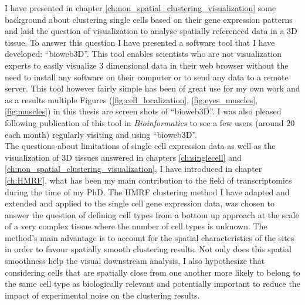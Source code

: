 I have presented in chapter \ref{ch:non_spatial_clustering_visualization} some background about clustering single cells based on their gene expression patterns and laid the question of visualization to analyse spatially referenced data in a 3D tissue. To answer this question I have presented a software tool that I have developed: ``bioweb3D''. This tool enables scientists who are not visualization experts to easily visualize 3 dimensional data in their web browser without the need to install any software on their computer or to send any data to a remote server. This tool however fairly simple has been of great use for my own work and as a results multiple Figures (\ref{fig:cell_localization}, \ref{fig:eyes_muscles}, \ref{fig:muscles}) in this thesis are screen shots of ``bioweb3D''. I was also pleased following publication of this tool in \emph{Bioinformatics} \cite{Pettit13} to see a few users (around 20 each month) regularly visiting and using ``bioweb3D''.\\

The questions about limitations of single cell expression data as well as the visualization of 3D tissues answered in chapters \ref{ch:singlecell} and \ref{ch:non_spatial_clustering_visualization}, I have introduced in chapter \ref{ch:HMRF}, what has been my main contribution to the field of transcriptomics during the time of my PhD. The HMRF clustering method I have adapted and extended and applied to the single cell gene expression data, was chosen to answer the question of defining cell types from a bottom up approach at the scale of a very complex tissue where the number of cell types is unknown. The method's main advantage is to account for the spatial characteristics of the sites in order to favour spatially smooth clustering results. Not only does this spatial smoothness help the visual downstream analysis, I also hypothesize that considering cells that are spatially close from one another more likely to belong to the same cell type as biologically relevant and potentially important to reduce the impact of experimental noise on the clustering results.\\

